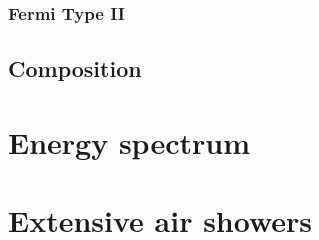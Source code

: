 \subsubsection{Fermi Type II}
\label{sssec:cr-fermi-ii}






\subsection{Composition}
\label{ssec:cr-composition}



\section{Energy spectrum}
\label{sec:cr-energy-spectrum}


\section{Extensive air showers}
\label{sec:extensive-air-showers}








